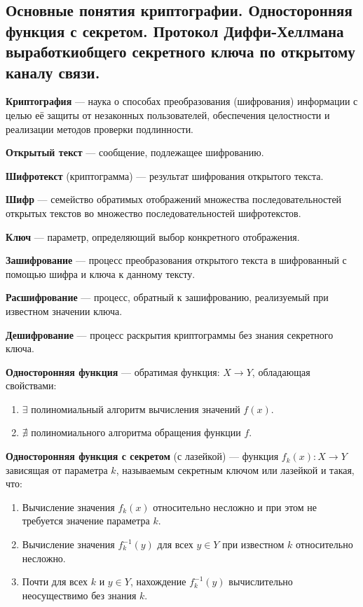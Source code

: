 \subsection{Основные  понятия  криптографии.  Односторонняя  функция  с  секретом.  Протокол  Диффи-Хеллмана выработкиобщего секретного ключа по открытому каналу связи.}

\textbf{Криптография} --- наука о способах преобразования (шифрования) информации с целью её защиты от незаконных пользователей, обеспечения целостности и реализации методов проверки подлинности.

\textbf{Открытый текст} --- сообщение, подлежащее шифрованию.

\textbf{Шифротекст} (криптограмма) --- результат шифрования открытого текста.

\textbf{Шифр} --- семейство обратимых отображений множества последовательностей открытых текстов во множество последовательностей шифротекстов.

\textbf{Ключ} --- параметр, определяющий выбор конкретного отображения.

\textbf{Зашифрование} --- процесс преобразования открытого текста в шифрованный с помощью шифра и ключа к данному тексту.

\textbf{Расшифрование} --- процесс, обратный к зашифрованию, реализуемый при известном значении ключа.

\textbf{Дешифрование} --- процесс раскрытия криптограммы без знания секретного ключа.

\textbf{Односторонняя функция} --- обратимая функция: $X \rightarrow Y$, обладающая свойствами:
\begin{enumerate}
    \item $\exists$ полиномиальный алгоритм вычисления значений $f(x)$.
    \item $\nexists$ полиномиального алгоритма обращения функции $f$.
\end{enumerate}

\textbf{Односторонняя функция с секретом} (с лазейкой) — функция $f_k(x): X \rightarrow Y$ зависящая от параметра $k$, называемым секретным ключом или лазейкой и такая, что:
\begin{enumerate}
    \item Вычисление значения $f_k(x)$ относительно несложно и при этом не требуется значение параметра $k$.
    \item Вычисление значения $f^{-1}_k(y)$ для всех $y \in Y$ при известном $k$ относительно несложно.
    \item Почти для всех $k$ и $y \in Y$, нахождение $f^{-1}_k(y)$ вычислительно неосуществимо без знания $k$.
\end{enumerate}

